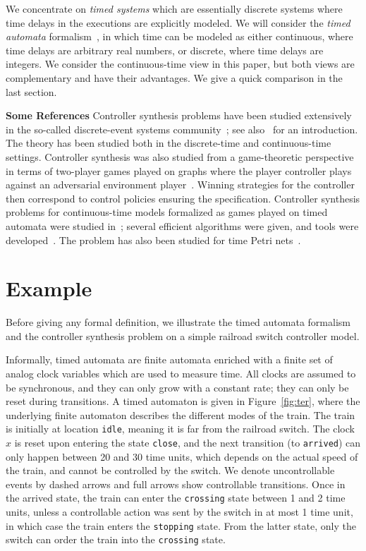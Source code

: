 \documentclass{article}
\begin{document}
We concentrate on \emph{timed systems} which are essentially discrete systems
where time delays in the executions are explicitly modeled. We will consider
the \emph{timed automata} formalism~\cite{AD-tcs94}, in which time can be
modeled as either continuous, where time delays are arbitrary real numbers, or
discrete, where time delays are integers. We consider the continuous-time view
in this paper, but both views are complementary and have 
their advantages. We give a quick comparison in the last section.

\textbf{Some References}
Controller synthesis problems have been studied extensively in the so-called
discrete-event systems community~\cite{rw-1989}; see also~\cite{CL-book06} for
an introduction. The theory has been studied both in the discrete-time and
continuous-time settings. Controller synthesis was also studied from a
game-theoretic perspective in terms of two-player games played on
graphs where the player controller plays against an adversarial environment
player~\cite{PR-popl89,ALW89,Dill89}.
Winning strategies for the controller then correspond to control
policies ensuring the specification. 
Controller synthesis problems for continuous-time models formalized as games
played on timed automata were 
studied in~\cite{AMP-concur98,AMPS98}; several efficient algorithms were
given, and tools were developed~\cite{TA-fm99,altisen2002tools,Cassez05}.
The problem has also been studied for time Petri nets~\cite{gardey2006safety}.

\section{Example}
Before giving any formal definition, we illustrate the timed automata formalism and the controller synthesis
problem on a simple railroad switch controller model.

Informally, timed automata are finite automata enriched with a finite set of analog clock
variables which are used to measure time. 
All clocks are assumed to be synchronous, and they can only grow with a constant rate; they can only be reset
during transitions. A timed automaton is given in Figure~\ref{fig:ter}, where
the underlying finite automaton describes the different modes of the train. 
The train is initially at location \texttt{idle}, meaning it is far from the
railroad switch. The clock~$x$
is reset upon entering the state \texttt{close}, and the next transition
(to \texttt{arrived}) can only happen between 20 and 30 time units, which
depends on the actual speed of the train, and cannot be controlled by the
switch. 
We denote uncontrollable events by dashed arrows and full arrows show
controllable transitions.
Once in the arrived state, the train can enter the \texttt{crossing} state
between 1 and 2 time units, unless a controllable action was sent by the switch
in at most 1 time unit, in which case the train enters the \texttt{stopping}
state. From the latter state, only the switch can order the train into the
\texttt{crossing} state.
\end{document}
